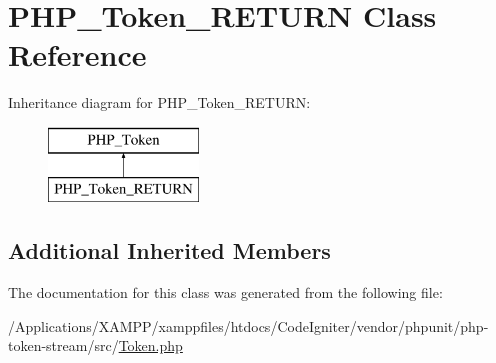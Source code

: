 \hypertarget{class_p_h_p___token___r_e_t_u_r_n}{}\section{P\+H\+P\+\_\+\+Token\+\_\+\+R\+E\+T\+U\+RN Class Reference}
\label{class_p_h_p___token___r_e_t_u_r_n}
Inheritance diagram for P\+H\+P\+\_\+\+Token\+\_\+\+R\+E\+T\+U\+RN\+:\begin{figure}[H]
\begin{center}
\leavevmode
\includegraphics[height=2.000000cm]{class_p_h_p___token___r_e_t_u_r_n}
\end{center}
\end{figure}
\subsection*{Additional Inherited Members}


The documentation for this class was generated from the following file\+:\begin{DoxyCompactItemize}
\item 
/\+Applications/\+X\+A\+M\+P\+P/xamppfiles/htdocs/\+Code\+Igniter/vendor/phpunit/php-\/token-\/stream/src/\mbox{\hyperlink{_token_8php}{Token.\+php}}\end{DoxyCompactItemize}
